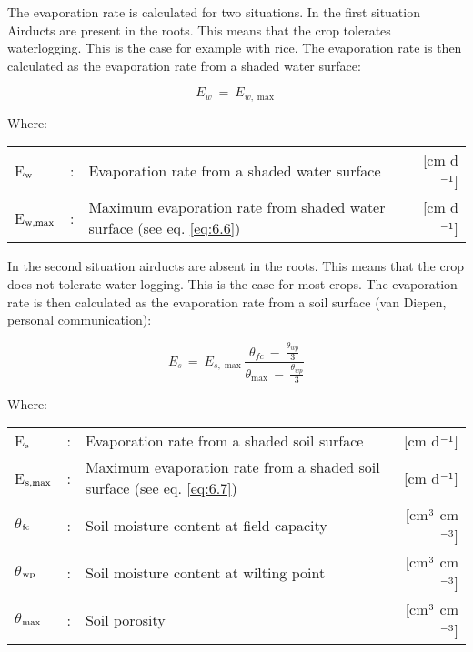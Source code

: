 The evaporation rate is calculated for two situations. In the first situation
Airducts are present in the roots. This means that the crop tolerates waterlogging. This
is the case for example with rice. The evaporation rate is then calculated as the 
evaporation rate from a shaded water surface:

\begin{equation}
E _{w} ~=~ E _{w, \max } 
\end{equation}

Where:\\[5pt]
\begin{tabularx}{\textwidth}{llXr}
    E$_{{\rm w}}$ &:& Evaporation rate from a shaded water surface & [cm d$^{{\rm -1}}$]\\
    E$_{{\rm w,max}}$ &:& Maximum evaporation rate from shaded 
    water surface (see eq. \ref{eq:6.6}) & [cm d$^{{\rm -1}}$]\\
\end{tabularx}

In the second situation airducts are absent in the roots. This means that the crop does
not tolerate water
logging. This is the case for most crops. The evaporation rate is then calculated as the
evaporation rate from a soil surface (van Diepen, personal communication):  

\begin{equation}
\label{eq:6.17}
E _{s~} =~ E _{s,\max } {\frac{ \theta  _{fc} ~-~ {{\frac{\theta  _{wp} }{3}}} }{\theta  _{\max } ~-~{{\frac{\theta  _{wp} }{3}}} }}
\end{equation}

Where:\\[5pt]
\begin{tabularx}{\textwidth}{llXr}
    E$_{{\rm s}}$ &:& Evaporation rate from a shaded soil surface & [cm d$^{{\rm -1}}$]\\
    E$_{{\rm s,max}}$ &:& Maximum evaporation rate from a shaded
    soil surface (see eq. \ref{eq:6.7}) & [cm d$^{{\rm -1}}$]\\
    $\theta$$_{{\rm fc}}$ &:& Soil moisture content at field capacity & [cm$^{{\rm 3}}$ cm$^{{\rm -3}}$]\\
    $\theta$$_{{\rm wp}}$ &:& Soil moisture content at wilting point & [cm$^{{\rm 3}}$ cm$^{{\rm -3}}$]\\
    $\theta$$_{{\rm max}}$ &:& Soil porosity & [cm$^{{\rm 3}}$ cm$^{{\rm -3}}$]\\
\end{tabularx}

